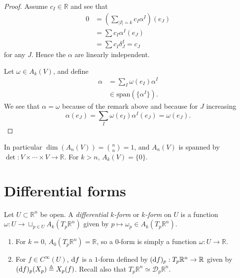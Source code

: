 \begin{proof}
Assume $c_I \in \mathbb{R}$ and see that
\begin{align*}
   0
&= \left(\sum_{|I|=k} c_I \alpha^I\right)(e_J) \\
&= \sum c_I \alpha^I(e_J) \\
&= \sum c_I \delta^I_J = c_J
\end{align*}
for any $J$. Hence the $\alpha$ are linearly independent.

Let $\omega \in A_k(V)$, and define
\begin{align*}
     \alpha
&=   \sum_I \omega(e_I) \alpha^I \\
&\in \mathrm{span}(\{ \alpha^I \}).
\end{align*}
We see that $\alpha = \omega$ because of the remark above and because
for $J$ increasing
$$
  \alpha(e_J)
= \sum_I \omega(e_I) \alpha^I(e_J)
= \omega(e_J).
$$
\end{proof}

In particular $\dim(A_n(V)) = {n \choose n} = 1$, and $A_n(V)$ is
spanned by $\det: V \times \cdots \times V \to \mathbb{R}$.
For $k > n$, $A_k(V) = \{ 0 \}$.

\section*{Differential forms}

\begin{defn}
Let $U \subset \mathbb{R}^n$ be open. A \emph{differential $k$-form}
or \emph{$k$-form} on $U$ is a function
$\omega : U \to \sqcup_{p \in U} A_k(T_p \mathbb{R}^n)$ given by
$p \mapsto \omega_p \in A_k(T_p \mathbb{R}^n)$.
\end{defn}

\begin{xmpl}
  \begin{enumerate}
    \item{
       For $k = 0$,
       $A_0(T_p \mathbb{R}^n) = \mathbb{R}$, so a $0$-form is simply a
       function $\omega: U \to \mathbb{R}$.
    }
    \item{
      For $f \in C^\infty(U)$, $\mathop{}\!\mathrm{d} f$ is a $1$-form defined by
      $(\mathop{}\!\mathrm{d} f)_p : T_p \mathbb{R}^n \to \mathbb{R}$ given by
      $(\mathop{}\!\mathrm{d} f)_p (X_p) \triangleq X_p(f)$. Recall also that
      $T_p \mathbb{R}^n \simeq \mathcal{D}_p \mathbb{R}^n$.
    }
  \end{enumerate}
\end{xmpl}


